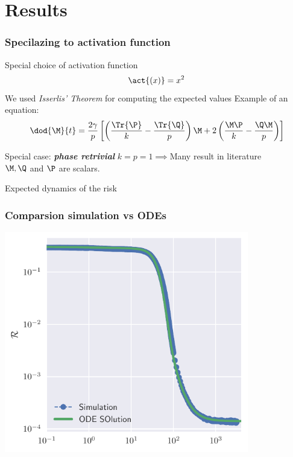 \documentclass{beamer}
\begin{document}
\section{Results}
\begin{frame}
  \frametitle{Specilazing to activation function}
  Special choice of activation function
  \[
    \act{(x)} = x^2
  \]
  We used \emph{Isserlis' Theorem} for computing the expected values
  \pause
  \vfill
  Example of an equation:
  \[
    \dod{\M}{t} = \frac{2 \gamma}{p}\left[
        \left(\frac{\Tr{\P}}k - \frac{\Tr{\Q}}p\right)\M +
        2\left(\frac{\M\P}{k} - \frac{\Q\M}{p}\right)
    \right]
  \]
  \pause
  \vfill
  \begin{block}{Special case: \textbf{\emph{phase retrivial}}}
    \(k=p=1 \implies\)Many result in literature \\
    \(\M, \Q\) and \(\P\) are scalars.

  \end{block}

\end{frame}

\begin{frame}{Expected dynamics of the risk}
  \begin{center}
    \begin{tikzpicture}[
      x=.7cm,
      y=.7cm
    ]
      
    \end{tikzpicture}
  \end{center}
  
\end{frame}

\begin{frame}
  \frametitle{Comparsion simulation vs ODEs }
    \begin{center}
      \includegraphics[width=0.8\textwidth]{figures/simulation_examples_trajectory.pdf}
    \end{center}
\end{frame}
\end{document}
